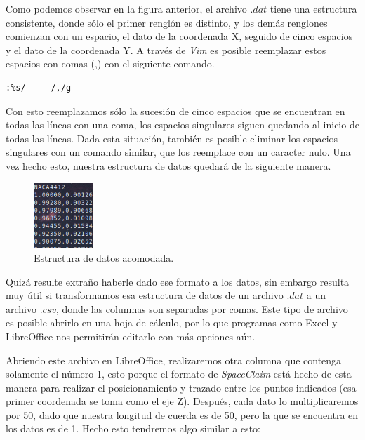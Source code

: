 \documentclass[12pt, letterpaper]{article}
\begin{document}
Como podemos observar en la figura anterior, el archivo $.dat$ tiene una estructura consistente, donde sólo el primer renglón es distinto, y los demás renglones comienzan con un espacio, el dato de la coordenada X, seguido de cinco espacios y el dato de la coordenada Y. A través de \textit{Vim} es posible reemplazar estos espacios con comas (,) con el siguiente comando.
\begin{tcolorbox}[
	enhanced,
	attach boxed title to top left={xshift=6mm,yshift=-3mm},
	colback=white,
	colframe=lightgreen!10,
	colbacktitle=lightgreen!10,
	title=Comando de Vim,
	fonttitle=\bfseries\color{black},
	boxed title style={size=small,colframe=white!20,sharp corners},
	sharp corners,
] %

\begin{lstlisting}[language=bash]
:%s/     /,/g
\end{lstlisting}
\end{tcolorbox}

Con esto reemplazamos sólo la sucesión de cinco espacios que se encuentran en todas las líneas con una coma, los espacios singulares siguen quedando al inicio de todas las líneas. Dada esta situación, también es posible eliminar los espacios singulares con un comando similar, que los reemplace con un caracter nulo. Una vez hecho esto, nuestra estructura de datos quedará de la siguiente manera.

\begin{figure}[H]
	\centering
	\includegraphics[width=0.2\textwidth]{02.png}
	\caption{Estructura de datos acomodada.}
\end{figure}

Quizá resulte extraño haberle dado ese formato a los datos, sin embargo resulta muy útil si transformamos esa estructura de datos de un archivo $.dat$ a un archivo $.csv$, donde las columnas son separadas por comas. Este tipo de archivo es posible abrirlo en una hoja de cálculo, por lo que programas como Excel y LibreOffice nos permitirán editarlo con más opciones aún.

Abriendo este archivo en LibreOffice, realizaremos otra columna que contenga solamente el número 1, esto porque el formato de \textit{SpaceClaim} está hecho de esta manera para realizar el posicionamiento y trazado entre los puntos indicados (esa primer coordenada se toma como el eje Z). Después, cada dato lo multiplicaremos por 50, dado que nuestra longitud de cuerda es de 50, pero la que se encuentra en los datos es de 1. Hecho esto tendremos algo similar a esto:
\end{document}
